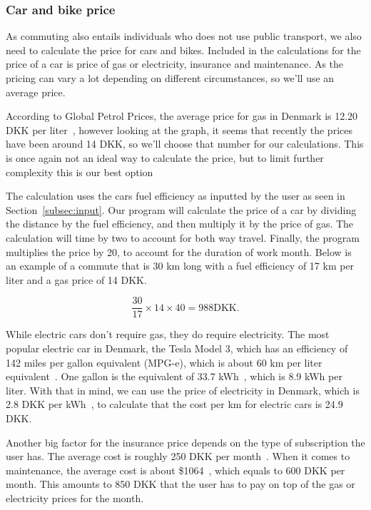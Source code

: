 \subsubsection{Car and bike price}

As commuting also entails individuals who does not use public transport, we also need to calculate the price for cars
and bikes.
Included in the calculations for the price of a car is price of gas or electricity, insurance and maintenance.
As the pricing can vary a lot depending on different circumstances, so we'll use an average price.

According to Global Petrol Prices, the average price for gas in Denmark is 12.20 DKK per liter~\cite{price_gas}, however
looking at the graph, it seems that recently the prices have been around 14 DKK, so we'll choose that number for our
calculations.
This is once again not an ideal way to calculate the price, but to limit further complexity this is our best option

The calculation uses the cars fuel efficiency as inputted by the user as seen in Section~\ref{subsec:input}.
Our program will calculate the price of a car by dividing the distance by the fuel efficiency, and then multiply it by
the price of gas.
The calculation will time by two to account for both way travel.
Finally, the program multiplies the price by 20, to account for the duration of work month.
Below is an example of a commute that is 30 km long with a fuel efficiency of 17 km per liter and a gas price of 14 DKK.

\begin{equation}
    \frac{30}{17} \times 14 \times 40 = 988 \text{DKK}.
\end{equation}

While electric cars don't require gas, they do require electricity.
The most popular electric car in Denmark, the Tesla Model 3, which has an efficiency of 142 miles per gallon equivalent
(MPG-e), which is about 60 km per liter equivalent~\cite{price_el}.
One gallon is the equivalent of 33.7 kWh~\cite{price_mpge}, which is 8.9 kWh per liter.
With that in mind, we can use the price of electricity in Denmark, which is 2.8 DKK per kWh~\cite{price_energy}, to
calculate that the cost per km for electric cars is 24.9 DKK.

Another big factor for the insurance price depends on the type of subscription the user has.
The average cost is roughly 250 DKK per month~\cite{price_insurance}.
When it comes to maintenance, the average cost is about \$1064~\cite{price_repair}, which equals to 600 DKK per month.
This amounts to 850 DKK that the user has to pay on top of the gas or electricity prices for the month.

